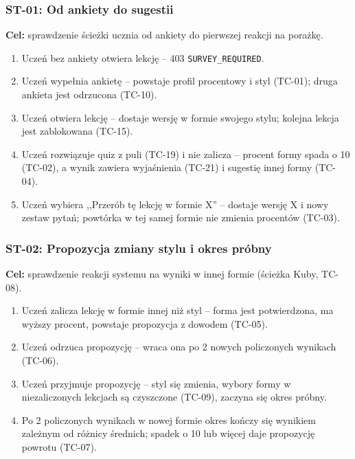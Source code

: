 \subsubsection{ST-01: Od ankiety do sugestii}
\textbf{Cel:} sprawdzenie ścieżki ucznia od ankiety do pierwszej reakcji na porażkę.
\begin{enumerate}[leftmargin=*]
    \item Uczeń bez ankiety otwiera lekcję -- 403 \texttt{SURVEY\_REQUIRED}.
    \item Uczeń wypełnia ankietę -- powstaje profil procentowy i styl (TC-01); druga ankieta jest odrzucona (TC-10).
    \item Uczeń otwiera lekcję -- dostaje wersję w formie swojego stylu; kolejna lekcja jest zablokowana (TC-15).
    \item Uczeń rozwiązuje quiz z puli (TC-19) i nie zalicza -- procent formy spada o 10 (TC-02), a wynik zawiera wyjaśnienia (TC-21) i sugestię innej formy (TC-04).
    \item Uczeń wybiera ,,Przerób tę lekcję w formie X'' -- dostaje wersję X i nowy zestaw pytań; powtórka w tej samej formie nie zmienia procentów (TC-03).
\end{enumerate}

\subsubsection{ST-02: Propozycja zmiany stylu i okres próbny}
\textbf{Cel:} sprawdzenie reakcji systemu na wyniki w innej formie (ścieżka Kuby, TC-08).
\begin{enumerate}[leftmargin=*]
    \item Uczeń zalicza lekcję w formie innej niż styl -- forma jest potwierdzona, ma wyższy procent, powstaje propozycja z dowodem (TC-05).
    \item Uczeń odrzuca propozycję -- wraca ona po 2 nowych policzonych wynikach (TC-06).
    \item Uczeń przyjmuje propozycję -- styl się zmienia, wybory formy w niezaliczonych lekcjach są czyszczone (TC-09), zaczyna się okres próbny.
    \item Po 2 policzonych wynikach w nowej formie okres kończy się wynikiem zależnym od różnicy średnich; spadek o 10 lub więcej daje propozycję powrotu (TC-07).
\end{enumerate}

